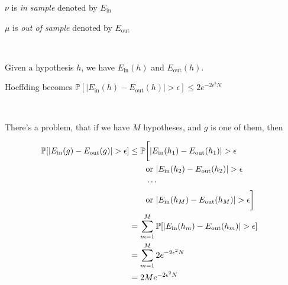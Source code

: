 \documentclass[11pt]{article}
\begin{document}
\begin{spacing}{1.2}
$\nu$ is {\it in sample} denoted by $E_{\text{in}}$

$\mu$ is {\it out of sample} denoted by $E_{\text{out}}$

\

Given a hypothesis $h$, we have $E_{\text{in}}(h)$ and $E_{\text{out}}(h)$.

Hoeffding becomes \qquad $\mathbb{P} \left[ \left| E_{\text{in}}(h) - E_{\text{out}}(h) \right| > \epsilon \right] \le 2e^{-2\epsilon^2 N}$

\

There's a problem, that if we have $M$ hypotheses, and $g$ is one of them, then 

\begin{align*}
	\mathbb{P} [ | E_{\text{in}}(g) - E_{\text{out}}(g)| > \epsilon] & \le
	\mathbb{P} \bigg[ | E_{\text{in}}(h_1) - E_{\text{out}}(h_1)| > \epsilon \cr
	& \qquad \text{or } | E_{\text{in}}(h_2) - E_{\text{out}}(h_2)| > \epsilon \cr
	& \qquad \cdots \cr
	& \qquad \text{or } | E_{\text{in}}(h_M) - E_{\text{out}}(h_M)| > \epsilon \bigg] \cr
	&= \sum_{m=1}^M \mathbb{P} [ | E_{\text{in}}(h_m) - E_{\text{out}}(h_m)| > \epsilon ] \cr
	&= \sum_{m=1}^M 2e^{-2 \epsilon^2 N} \cr
	&= 2Me^{-2 \epsilon^2 N} \cr
\end{align*}

\clearpage
{}
\printindex

\end{spacing}
\end{document}
